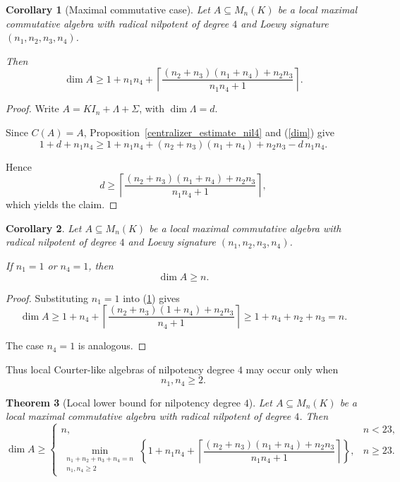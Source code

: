 \documentclass[11pt]{article}
\theoremstyle{remark}
\theoremstyle{plain}
\newtheorem{theorem}{Theorem}
\newtheorem{corollary}[theorem]{Corollary}
\theoremstyle{definition}
\theoremstyle{myremark}
\begin{document}
\begin{corollary}[Maximal commutative case]
	\label{general4}
	Let \(A\subseteq M_n(K)\) be a local maximal commutative algebra with
	radical nilpotent of degree \(4\) and Loewy signature
	\((n_1,n_2,n_3,n_4)\).
	
	Then
	\[
	\dim A
	\ge
	1+n_1n_4+
	\left\lceil
	\frac{(n_2+n_3)(n_1+n_4)+n_2n_3}{n_1n_4+1}
	\right\rceil.
	\]
\end{corollary}

\begin{proof}
	Write \(A=KI_n+\Lambda+\Sigma\), with \(\dim\Lambda=d\).
	
	Since \(C(A)=A\), Proposition~\ref{centralizer_estimate_nil4} and (\ref{dim}) give
	\[
	1+d+n_1n_4
	\ge
	1+n_1n_4+(n_2+n_3)(n_1+n_4)+n_2n_3-d\,n_1n_4.
	\]
	
	Hence
	\[
	d
	\ge
	\left\lceil
	\frac{(n_2+n_3)(n_1+n_4)+n_2n_3}{n_1n_4+1}
	\right\rceil,
	\]
	which yields the claim.
\end{proof}

\begin{corollary}
	Let \(A\subseteq M_n(K)\) be a local maximal commutative algebra with
	radical nilpotent of degree \(4\) and Loewy signature
	\((n_1,n_2,n_3,n_4)\).
	
	If \(n_1=1\) or \(n_4=1\), then
	\[
	\dim A\ge n.
	\]
\end{corollary}

\begin{proof}
	Substituting \(n_1=1\) into (\ref{general4}) gives
	\[
	\dim A
	\ge
	1+n_4+
	\left\lceil
	\frac{(n_2+n_3)(1+n_4)+n_2n_3}{n_4+1}
	\right\rceil
	\ge
	1+n_4+n_2+n_3=n.
	\]
	
	The case \(n_4=1\) is analogous.
\end{proof}

Thus local Courter-like algebras of nilpotency degree \(4\) may occur only
when
\[
n_1,n_4\ge2.
\]

\begin{theorem}[Local lower bound for nilpotency degree \(4\)]
	\label{local_nil4_bound}
	Let \(A\subseteq M_n(K)\) be a local maximal commutative algebra with
	radical nilpotent of degree \(4\). Then
	\[
	\dim A\ge
	\begin{cases}
		n, & n<23,\\[2mm]
		\displaystyle
		\min_{\substack{n_1+n_2+n_3+n_4=n\\ n_1,n_4\ge2}}
		\left\{
		1+n_1n_4+
		\left\lceil
		\dfrac{(n_2+n_3)(n_1+n_4)+n_2n_3}{n_1n_4+1}
		\right\rceil
		\right\},
		& n\ge23.
	\end{cases}
	\]
\end{theorem}
\end{document}
